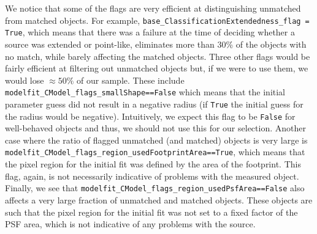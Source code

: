\documentclass[\docopts]{\docclass}
\begin{document}
We notice that some of the flags are very efficient at distinguishing unmatched from matched objects. For example, \texttt{base\_ClassificationExtendedness\_flag = True}, which means that there was a failure at the time of deciding whether a source was extended or point-like, eliminates more than 30\% of the objects with no match, while barely affecting the matched objects. Three other flags would be fairly efficient at filtering out unmatched objects but, if we were to use them, we would lose $\approx 50\%$ of our sample. These include \texttt{modelfit\_CModel\_flags\_smallShape==False} which means that the initial parameter guess did not result in a negative radius (if \texttt{True} the initial guess for the radius would be negative). Intuitively, we expect this flag to be \texttt{False} for well-behaved objects and thus, we should not use this for our selection. Another case where the ratio of flagged unmatched (and matched) objects is very large is \texttt{modelfit\_CModel\_flags\_region\_usedFootprintArea==True}, which means that the pixel region for the initial fit was defined by the area of the footprint. This flag, again, is not necessarily indicative of problems with the measured object. Finally, we see that \texttt{modelfit\_CModel\_flags\_region\_usedPsfArea==False} also affects a very large fraction of unmatched and matched objects. These objects are such that the pixel region for the initial fit was not set to a fixed factor of the PSF area, which is not indicative of any problems with the source.
\end{document}
